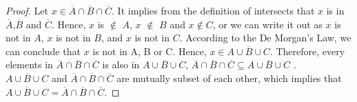 \documentclass[12pt]{article}
\begin{document}
\begin{enumerate}
\begin{enumerate}[label=(\alph*)]
\begin{proof}
			
			Let  $x \in  \overline{A} \cap \overline{B} \cap \overline{C}$. It implies from the definition of intersects that $x$ is in $\overline{A}$,$\overline{B}$ and $\overline{C}$. Hence, $x$ is $\notin$ $A$, $x$  $\notin$ $B$ and $x\notin C$, or we can write it out as $x$ is not in $A$, $x$ is not in $B$, and $x$ is not in $C$. According to the De Morgan's Law, we can conclude that $x$ is not in A, B or C. Hence, $x \in \overline{A \cup B \cup C}$. Therefore, every elements in $  \overline{A} \cap \overline{B} \cap \overline{C}$ is also in $\overline{A \cup B \cup C} $, $  \overline{A} \cap \overline{B} \cap \overline{C}\subseteq \overline{A \cup B \cup C}$ .\\
		
			  $\overline{A \cup B \cup C}$ and $\overline{A} \cap \overline{B} \cap \overline{C}$ are mutually subset of each other, which implies that 		$\overline{A \cup B \cup C} = \overline{A} \cap \overline{B} \cap \overline{C}$.
		\end{proof}
		

\end{enumerate}
\end{enumerate}
\end{document}
